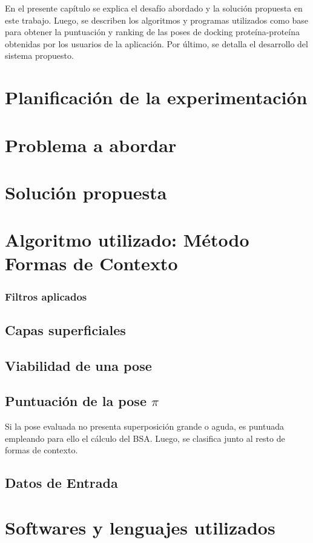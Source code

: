
En el presente capítulo se explica el desafío abordado y la solución propuesta en este trabajo. Luego, se describen los algoritmos y programas utilizados como base para obtener la puntuación y ranking de las poses de docking proteína-proteína obtenidas por los usuarios de la aplicación. Por último, se detalla el desarrollo del sistema propuesto.

\section{Planificación de la experimentación}

\section{Problema a abordar}
\section{Solución propuesta}
\section{Algoritmo utilizado: Método Formas de Contexto}
\subsubsection{Filtros aplicados}
\subsection{Capas superficiales}
\subsection{Viabilidad de una pose}
\subsection{Puntuación de la pose $\pi$}
Si la pose evaluada no presenta superposición grande o aguda, es puntuada empleando para ello el cálculo del BSA. Luego, se clasifica junto al resto de formas de contexto.

\subsection{Datos de Entrada}
\section{Softwares y lenguajes utilizados}

